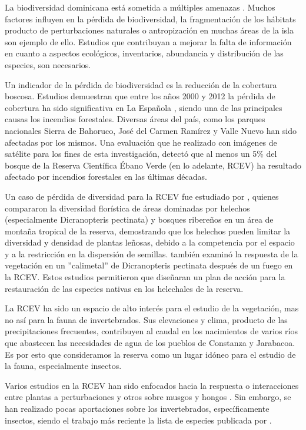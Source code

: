 \documentclass[12pt,letterpaper,spanish]{article}
\begin{document}
La biodiversidad dominicana está sometida a múltiples amenazas \citep{fern2015reservas, kennedy20064000, myers2004evaluacion}. Muchos factores influyen en la pérdida de biodiversidad, la fragmentación de los hábitats producto de perturbaciones naturales o antropización en muchas áreas de la isla son ejemplo de ello. Estudios que contribuyan a mejorar la falta de información en cuanto a aspectos ecológicos, inventarios, abundancia y distribución de las especies, son necesarios.

Un indicador de la pérdida de biodiversidad es la reducción de la cobertura boscosa. Estudios demuestran que entre los años 2000 y 2012 la pérdida de cobertura ha sido significativa en La Española \citep{hansen2013high}, siendo una de las principales causas los incendios forestales. Diversas áreas del país, como los parques nacionales Sierra de Bahoruco, José del Carmen Ramírez y Valle Nuevo \citep{myers2004evaluacion} han sido afectadas por los mismos. Una evaluación que he realizado con imágenes de satélite para los fines de esta investigación, detectó que al menos un 5\% del bosque de la Reserva Científica Ébano Verde (en lo adelante, RCEV) ha resultado afectado por incendios forestales en las últimas décadas. 

Un caso de pérdida de diversidad para la RCEV fue estudiado por \citet{slocum2000vegetacion}, quienes compararon la diversidad florística de áreas dominadas por helechos (especialmente Dicranopteris pectinata) y bosques ribereños en un área de montaña tropical de la reserva, demostrando que los helechos pueden limitar la diversidad y densidad de plantas leñosas, debido a la competencia por el espacio y a la restricción en la dispersión de semillas. \citet{may2000respuesta} también examinó la respuesta de la vegetación en un ''calimetal'' de Dicranopteris pectinata después de un fuego en la RCEV. Estos estudios permitieron que \citet{navarro2006restauracion} diseñaran un plan de acción para la restauración de las especies nativas en los helechales de la reserva.

La RCEV ha sido un espacio de alto interés para el estudio de la vegetación, mas no así para la fauna de invertebrados. Sus elevaciones y clima, producto de las precipitaciones frecuentes, contribuyen al caudal en los nacimientos de varios ríos que abastecen las necesidades de agua de los pueblos de Constanza y Jarabacoa. Es por esto que consideramos la reserva como un lugar idóneo para el estudio de la fauna, especialmente insectos.

Varios estudios en la RCEV han sido enfocados hacia la respuesta o interacciones entre plantas a perturbaciones \citep{may2000respuesta, slocum2000vegetacion} y otros sobre musgos \citep{jimenez2011diversidad} y hongos \citep{quirico2004basidiomycetes}. Sin embargo, se han realizado pocas aportaciones sobre los  invertebrados, específicamente insectos, siendo el trabajo más reciente la lista de especies publicada  por \citet{perez2015entomofauna}.
\end{document}
